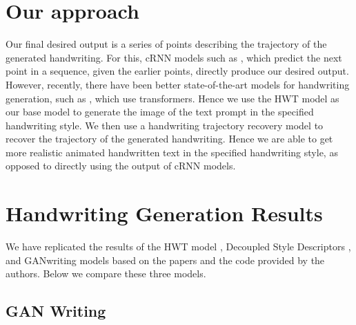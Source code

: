 \documentclass[10pt,twocolumn,letterpaper]{article}
\begin{document}
\section{Our approach}
Our final desired output is a series of points describing the trajectory of the generated handwriting. For this, cRNN models such as \cite{crnn,BRUSH-paper}, which predict the next point in a sequence, given the earlier points, directly produce our desired output. However, recently, there have been better state-of-the-art models for handwriting generation, such as \cite{HWT}, which use transformers. Hence we use the HWT model\cite{HWT} as our base model to generate the image of the text prompt in the specified handwriting style. We then use a handwriting trajectory recovery model \cite{image2stroke-1Char,img2stroke-multichar} to recover the trajectory of the generated handwriting. Hence we are able to get more realistic animated handwritten text in the specified handwriting style, as opposed to directly using the output of cRNN models.\\

\section{Handwriting Generation Results}
We have replicated the results of the HWT model \cite{HWT}, Decoupled Style Descriptors \cite{BRUSH-paper}, and GANwriting \cite{GAN-1} models based on the papers and the code provided by the authors. Below we compare these three models.

\subsection*{GAN Writing}
\end{document}
